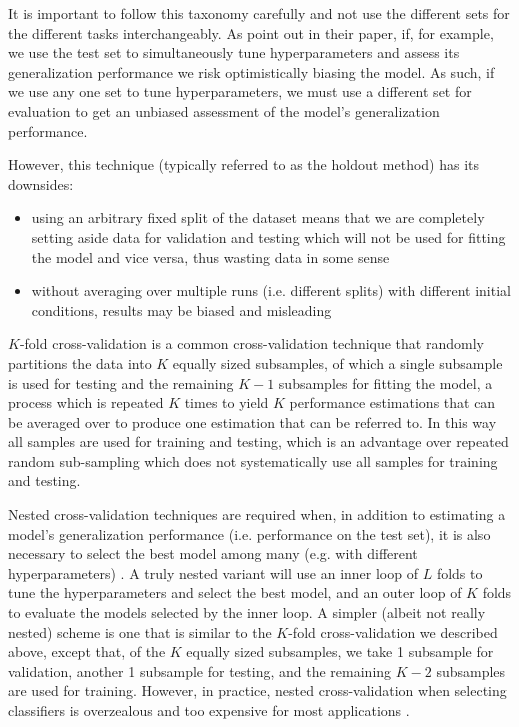 It is important to follow this taxonomy carefully and not use the different sets for the different tasks interchangeably. As \citeauthor{crossvalidationbias} point out in their \citeyear{crossvalidationbias} paper, if, for example, we use the test set to simultaneously tune hyperparameters and assess its generalization performance we risk optimistically biasing the model. As such, if we use any one set to tune hyperparameters, we must use a different set for evaluation to get an unbiased assessment of the model's generalization performance.

However, this technique (typically referred to as the holdout method) has its downsides:

\begin{itemize}
    \item using an arbitrary fixed split of the dataset means that we are completely setting aside data for validation and testing which will not be used for fitting the model and vice versa, thus wasting data in some sense
    \item without averaging over multiple runs (i.e. different splits) with different initial conditions, results may be biased and misleading
\end{itemize}

$K$-fold cross-validation is a common cross-validation technique that randomly partitions the data into $K$ equally sized subsamples, of which a single subsample is used for testing and the remaining $K-1$ subsamples for fitting the model, a process which is repeated $K$ times to yield $K$ performance estimations that can be averaged over to produce one estimation that can be referred to. In this way all samples are used for training and testing, which is an advantage over repeated random sub-sampling which does not systematically use all samples for training and testing.

Nested cross-validation techniques are required when, in addition to estimating a model's generalization performance (i.e. performance on the test set), it is also necessary to select the best model among many (e.g. with different hyperparameters) \cite{crossvalidationbias}. A truly nested variant will use an inner loop of $L$ folds to tune the hyperparameters and select the best model, and an outer loop of $K$ folds to evaluate the models selected by the inner loop. A simpler (albeit not really nested) scheme is one that is similar to the $K$-fold cross-validation we described above, except that, of the $K$ equally sized subsamples, we take 1 subsample for validation, another 1 subsample for testing, and the remaining $K-2$ subsamples are used for training. However, in practice, nested cross-validation when selecting classifiers is overzealous and too expensive for most applications \cite{nestedcvoverzealous}.

